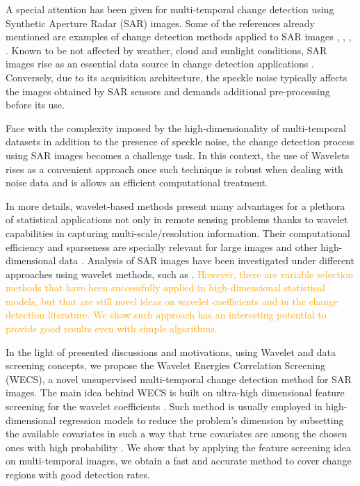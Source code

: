 \documentclass[journal]{IEEEtran}
\begin{document}
A special attention has been given for multi-temporal change detection using Synthetic Aperture Radar (SAR) images. 
Some of the references already mentioned are examples of change detection methods applied to SAR images \cite{barreto2016deforestation,ban2012multitemporal,scher2021mapping,quin2014mimosa}, \cite{jia2018novel}, \cite{hou2014unsupervised}, \cite{bovolo2005detail}. 
Known to be not affected by weather, cloud and sunlight conditions, SAR images rise as an essential data source in change detection applications \cite{bovolo2005detail}.
Conversely, due to its acquisition architecture, the speckle noise typically affects the images obtained by SAR sensors and demands additional pre-processing before its use.

Face with the complexity imposed by the high-dimensionality of multi-temporal datasets in addition to the presence of speckle noise, the change detection process using SAR images becomes a challenge task.
In this context, the use of Wavelets rises as a convenient approach once such technique is robust when dealing with noise data and is allows an efficient computational treatment. 

In more details, wavelet-based methods present many advantages for a plethora of statistical applications \cite{vidakovic1999statistical} not only in remote sensing problems thanks to wavelet capabilities in capturing multi-scale/resolution information. 
Their computational efficiency and sparseness are specially relevant for large images and other high-dimensional data \cite{morettin2017wavelets}. 
Analysis of SAR images have been investigated under different approaches using wavelet methods, such as \cite{atto2012multidate,bouhlel2015multivariate,celik2009multiscale,cui2012statistical}. 
\textcolor{orange}{However, there are variable selection methods that have been successfully applied in high-dimensional statistical models, but that are still novel ideas on wavelet coefficients and in the change detection literature. We show such approach has an interesting potential to provide good results even with simple algorithms.}


In the light of presented discussions and motivations, using Wavelet and data screening concepts, we propose the Wavelet Energies Correlation Screening (WECS), a novel unsupervised multi-temporal change detection method for SAR images.
%
The main idea behind WECS is built on ultra-high dimensional feature screening for the wavelet coefficients \cite{fan2020statistical}. Such method is usually employed in high-dimensional regression models to reduce the problem's dimension by subsetting the available covariates in such a way that true covariates are among the chosen ones with high probability \cite{fan2008sure}. We show that by applying the feature screening idea on multi-temporal images, we obtain a fast and accurate method to cover change regions with good detection rates.
\end{document}
